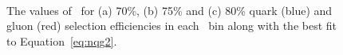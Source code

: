 \begin{figure}[p]
	\centering
	\\
	
	\caption{ The values of \ntrk\ for (a) 70\%,  (b) 75\%  and (c) 80\% quark (blue) and gluon (red) 
		selection efficiencies in each \pt\ bin along with the best fit to Equation~\ref{eq:nqg2}.
		\label{fig:qg_selection_curves_app}}
\end{figure}

